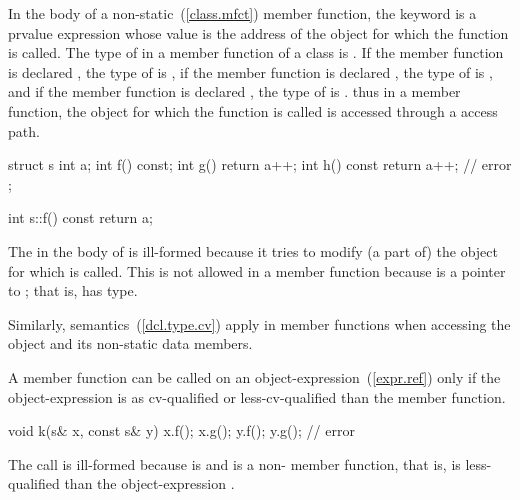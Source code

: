 \pnum
{}%
In the body of a non-static~(\ref{class.mfct}) member function, the
keyword  is a prvalue expression whose value is the
address of the object for which the function is called.
%
The type of  in a member function of a class  is
.
%
If the member function is declared , the type of
 is  ,
%
if the member function is declared , the type of
 is  , and if the member function
is declared  , the type of  is
  .
%
\enternote thus in a  member function, the object for which the function is
called is accessed through a  access path. \exitnote
\enterexample

\begin{codeblock}
struct s {
  int a;
  int f() const;
  int g() { return a++; }
  int h() const { return a++; } // error
};

int s::f() const { return a; }
\end{codeblock}

The  in the body of  is ill-formed because it
tries to modify (a part of) the object for which  is
called. This is not allowed in a  member function because
 is a pointer to ; that is,  has
 type.
\exitexample

\pnum
Similarly,  semantics~(\ref{dcl.type.cv}) apply in
 member functions when accessing the object and its
non-static data members.

\pnum
A  member function can be called on an
object-expression~(\ref{expr.ref}) only if the object-expression is as
cv-qualified or less-cv-qualified than the member function.
\enterexample

\begin{codeblock}
void k(s& x, const s& y) {
  x.f();
  x.g();
  y.f();
  y.g();                        // error
}
\end{codeblock}

The call  is ill-formed because  is 
and  is a non- member function, that is,
 is less-qualified than the object-expression .
\exitexample

